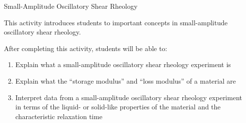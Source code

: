 %
%
%
%

\renewcommand{\figpath}{content/polymphys/mechanical-properties/SAOS/figs}
\renewcommand{\labelbase}{viscoelasticity}

\begin{activity}[extension]{Small-Amplitude Oscillatory Shear Rheology}

\begin{instructornotes}

	This activity introduces students to important concepts in small-amplitude oscillatory shear rheology.
	
	After completing this activity, students will be able to:
			\begin{enumerate}
				\item Explain what a small-amplitude oscillatory shear rheology experiment is
				\item Explain what the ``storage modulus'' and ``loss modulus'' of a material are
				\item Interpret data from a small-amplitude oscillatory shear rheology experiment in terms of the liquid- or solid-like properties of the material and the characteristic relaxation time
			\end{enumerate}
	
			

\end{instructornotes}
\end{activity}

